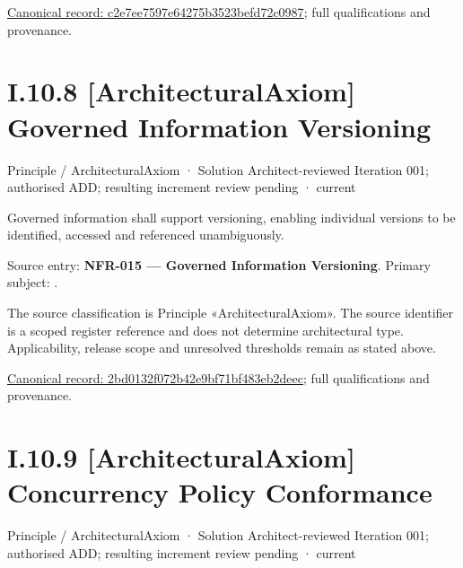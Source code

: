 {\footnotesize \href{../../../../../../../continuum/motivation/principle/architectural-axiom/c2e7ee7597e64275b3523befd72c0987.md}{Canonical record: c2e7ee7597e64275b3523befd72c0987}; full qualifications and provenance.}\par
\section*{I.10.8 [ArchitecturalAxiom] Governed Information Versioning}
\label{navigation:I.10.8}

\label{element:2bd0132f072b42e9bf71bf483eb2deec}
{\small Principle / ArchitecturalAxiom · Solution Architect-reviewed Iteration 001; authorised ADD; resulting increment review pending · current}\par

Governed information shall support versioning, enabling individual versions to be identified, accessed and referenced unambiguously.



Source entry: \textbf{NFR-015 — Governed Information Versioning}. Primary subject: \texttt{}.



The source classification is Principle «ArchitecturalAxiom». The source identifier is a scoped register reference and does not determine architectural type. Applicability, release scope and unresolved thresholds remain as stated above.


{\footnotesize \href{../../../../../../../continuum/motivation/principle/architectural-axiom/2bd0132f072b42e9bf71bf483eb2deec.md}{Canonical record: 2bd0132f072b42e9bf71bf483eb2deec}; full qualifications and provenance.}\par
\section*{I.10.9 [ArchitecturalAxiom] Concurrency Policy Conformance}
\label{navigation:I.10.9}

\label{element:7e3b05a2e3e547cbbd26b1e181af0d10}
{\small Principle / ArchitecturalAxiom · Solution Architect-reviewed Iteration 001; authorised ADD; resulting increment review pending · current}\par

